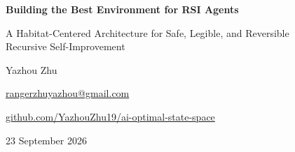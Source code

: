 \documentclass[11pt,a4paper]{article}
\begin{document}
\color{ink}

\thispagestyle{plain}
\begin{center}
\vspace*{0.35cm}
{\LARGE\bfseries Building the Best Environment for RSI Agents\par}
\vspace{7pt}
{\large A Habitat-Centered Architecture for Safe, Legible, and Reversible\\ Recursive Self-Improvement\par}
\vspace{16pt}
{\normalsize Yazhou Zhu\par}
\vspace{2pt}
{\small\href{mailto:rangerzhuyazhou@gmail.com}{rangerzhuyazhou@gmail.com}\par}
\vspace{3pt}
{\small\href{https://github.com/YazhouZhu19/ai-optimal-state-space}{github.com/YazhouZhu19/ai-optimal-state-space}\par}
\vspace{11pt}
{\small 23 September 2026\par}
\end{center}
\end{document}
